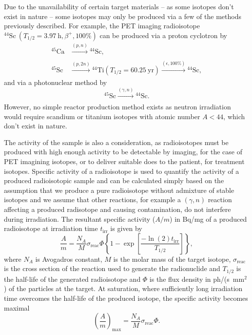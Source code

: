 \documentclass[../main.tex]{subfiles}
\begin{document}
Due to the unavailability of certain target materials -- as some isotopes don't exist in nature -- some isotopes may only be produced via a few of the methods previously described. For example, the PET imaging radioisotope $^{44}\mathrm{Sc}~\left(T_{1/2}=3.97~\si{\hour}, \beta^{+}, 100\%\right)$\cite{roesch2012scandium,muller2014promising} can be produced via a proton cyclotron by 
\begin{align}
^{45}\mathrm{Ca}&\xrightarrow[]{\left(p,n\right)}{}^{44}\mathrm{Sc},
\label{eq:44Sc_direct} \\
^{45}\mathrm{Sc}&\xrightarrow[]{\left(p,2n\right)}{}^{44}\mathrm{Ti}\left(T_{1/2}=60.25~\mathrm{yr}\right)\xrightarrow[]{\left(\epsilon, 100\%\right)}{}^{44}\mathrm{Sc},
\label{eq:44Sc_generator}
\end{align}
and via a photonuclear method by
\begin{equation}
^{45}\mathrm{Sc}\xrightarrow[]{\left(\gamma,n\right)}{}^{44}\mathrm{Sc}. \label{eq:44Sc_photonuclear}   
\end{equation}
However, no simple reactor production method exists as neutron irradiation would require scandium or titanium isotopes with atomic number $A < 44$, which don't exist in nature. 

The activity of the sample is also a consideration, as radioisotopes must be produced with high enough activity to be detectable by imaging, for the case of PET imagining isotopes, or to deliver suitable does to the patient, for treatment isotopes. Specific activity of a radioisotope is used to quantify the activity of a produced radioisotopic sample and can be calculated simply based on the assumption that we produce a pure radioisotope without admixture of stable isotopes \cite{habs2011production} and we assume that other reactions, for example a $\left(\gamma,n\right)$ reaction affecting a produced radisotope and causing contamination, do not interfere during irradiation. The resultant specific activity ($A/m$) in \si{\becquerel}/\si{\milli\gram} of a produced radioisotope at irradiation time $t_{\mathrm{irr}}$ is given by \cite{habs2011production}
\begin{equation}
\frac{A}{m} = \frac{N_{A}}{M}\sigma_{\mathrm{reac}}\Phi\left\{1-\exp\left[\frac{-\ln\left(2\right)t_{\mathrm{irr}}}{T_{1/2}}\right]\right\},
\label{eq:specific_activity}    
\end{equation}
where $N_{A}$ is Avogadros constant, $M$ is the molar mass of the target isotope, $\sigma_{\mathrm{reac}}$ is the cross section of the reaction used to generate the radionuclide and $T_{1/2}$ is the half-life of the generated radioisotope and $\Phi$ is the flux density in ph/(\si{\second}~$\mathrm{\si{\milli\meter}}^2$) of the particles at the target. At saturation, where sufficiently long irradiation time overcomes the half-life of the produced isotope, the specific activity becomes maximal
\begin{equation}
\left(\frac{A}{m}\right)_{\mathrm{max}} = \frac{N_{A}}{M}\sigma_{\mathrm{reac}}\Phi.
\label{eq:sat_specific_activity}    
\end{equation}
\end{document}
